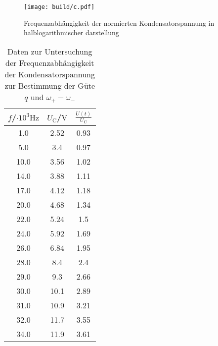 \begin{figure}
	\centering
	\texttt{[image: build/c.pdf]}
	\caption{Frequenzabhängigkeit der normierten Kondensatorspannung in halblogarithmischer darstellung}
	\label{fig:q}
\end{figure}
\begin{table}
	\caption{Daten zur Untersuchung der Frequenzabhängigkeit der Kondensatorspannung zur Bestimmung der Güte $q$ und $\omega_+ - \omega_- $}
	\label{tab:Kuh}
	\centering
	\begin{tabular}{ccc}
    \toprule
  	$f$/$\cdot 10^{3} \si{\Hz}$ & $U_\text{C}$/$\si{\volt}$ & $\frac{U(t)}{U_\text{C}}$ \\
    \midrule
    1.0                         & 2.52                      & 0.93                      \\
		5.0                         & 3.4                       & 0.97                      \\
		10.0                        & 3.56                      & 1.02                      \\
		14.0                        & 3.88                      & 1.11                      \\
		17.0                        & 4.12                      & 1.18                      \\
		20.0                        & 4.68                      & 1.34                      \\
		22.0                        & 5.24                      & 1.5                       \\
		24.0                        & 5.92                      & 1.69                      \\
		26.0                        & 6.84                      & 1.95                      \\
		28.0                        & 8.4                       & 2.4                       \\
		29.0                        & 9.3                       & 2.66                      \\
		30.0                        & 10.1                      & 2.89                      \\
		31.0                        & 10.9                      & 3.21                      \\
		32.0                        & 11.7                      & 3.55                      \\
		34.0                        & 11.9                      & 3.61                      \\

\end{tabular}
\end{table}

